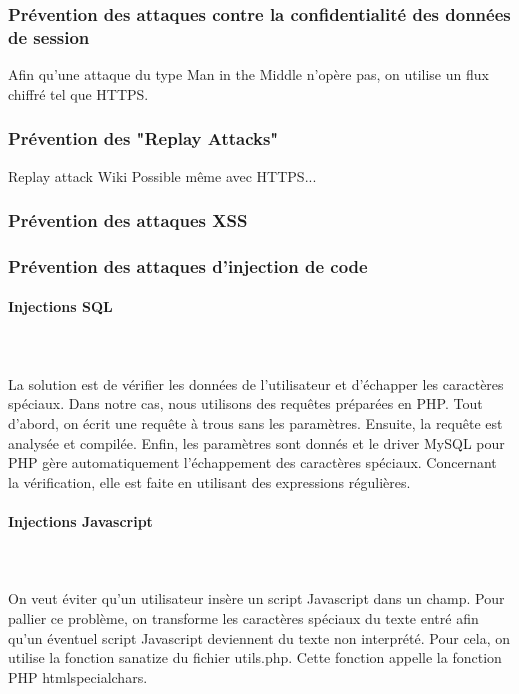 \documentclass[a4paper]{article}
\begin{document}
		\subsubsection{Prévention des attaques contre la confidentialité des données de session}
		
Afin qu'une attaque du type Man in the Middle n'opère pas, on utilise un flux chiffré tel que HTTPS.

		\subsubsection{Prévention des "Replay Attacks"}

		Replay attack Wiki
		Possible même avec HTTPS...
 		
 		\subsubsection{Prévention des attaques XSS}
 		
 		
 		
		\subsubsection{Prévention des attaques d'injection de code}
		
\paragraph{Injections SQL}
~~\\
\\
La solution est de vérifier les données de l'utilisateur et d'échapper les caractères spéciaux.
Dans notre cas, nous utilisons des requêtes préparées en PHP.
Tout d'abord, on écrit une requête à trous sans les paramètres.
Ensuite, la requête est analysée et compilée.
Enfin, les paramètres sont donnés et le driver MySQL pour PHP gère automatiquement l'échappement des caractères spéciaux.
Concernant la vérification, elle est faite en utilisant des expressions régulières.			
		
\paragraph{Injections Javascript}
~~\\
\\
On veut éviter qu'un utilisateur insère un script Javascript dans un champ.
Pour pallier ce problème, on transforme les caractères spéciaux du texte entré afin
qu'un éventuel script Javascript deviennent du texte non interprété.
Pour cela, on utilise la fonction sanatize du fichier utils.php. Cette fonction appelle
la fonction PHP htmlspecialchars.
		
\end{document}

